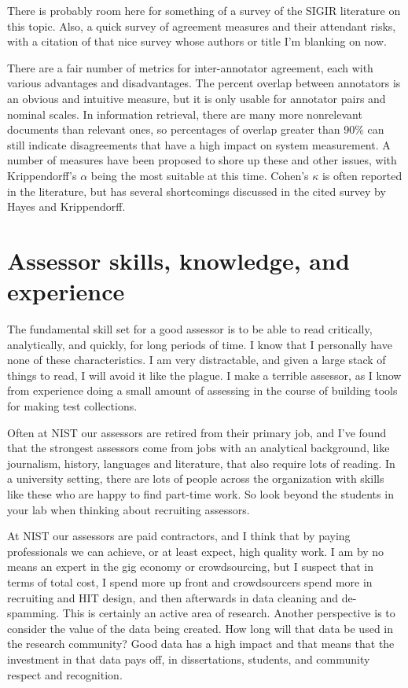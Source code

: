 \documentclass[nobib]{tufte-book}
\begin{document}
There is probably room here for something of a survey of the SIGIR literature on this topic.  Also, a quick survey of agreement measures and their attendant risks, with a citation of that nice survey whose authors or title I'm blanking on now.

There are a fair number of metrics for inter-annotator agreement, each with various advantages and disadvantages.  The percent overlap between annotators is an obvious and intuitive measure, but it is only usable for annotator pairs and nominal scales.  In information retrieval, there are many more nonrelevant documents than relevant ones, so percentages of overlap greater than 90\% can still indicate disagreements that have a high impact on system measurement.  A number of measures have been proposed to shore up these and other issues, with Krippendorff's $\alpha$ being the most suitable at this time.\autocite{hayes_answering_2007}  Cohen's $\kappa$ is often reported in the literature, but has several shortcomings discussed in the cited survey by Hayes and Krippendorff.

\section{Assessor skills, knowledge, and experience}

The fundamental skill set for a good assessor is to be able to read critically, analytically, and quickly, for long periods of time.  I know that I personally have none of these characteristics.  I am very distractable, and given a large stack of things to read, I will avoid it like the plague.  I make a terrible assessor, as I know from experience doing a small amount of assessing in the course of building tools for making test collections.

Often at NIST our assessors are retired from their primary job, and I've found that the strongest assessors come from jobs with an analytical background, like journalism, history, languages and literature, that also require lots of reading.  In a university setting, there are lots of people across the organization with skills like these who are happy to find part-time work.  So look beyond the students in your lab when thinking about recruiting assessors.

At NIST our assessors are paid contractors, and I think that by paying professionals we can achieve, or at least expect, high quality work. I am by no means an expert in the gig economy or crowdsourcing, but I suspect that in terms of total cost, I spend more up front and crowdsourcers spend more in recruiting and HIT design, and then afterwards in data cleaning and de-spamming.  This is certainly an active area of research.  Another perspective is to consider the value of the data being created.  How long will that data be used in the research community?  Good data has a high impact and that means that the investment in that data pays off, in dissertations, students, and community respect and recognition.
\end{document}
